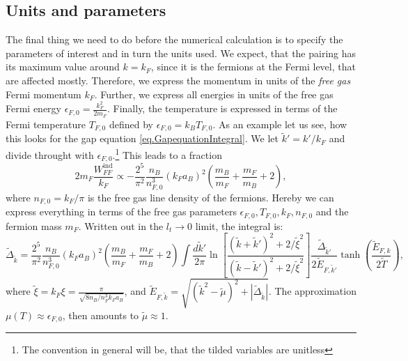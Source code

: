 \subsection{Units and parameters}
The final thing we need to do before the numerical calculation is to specify the parameters of interest and in turn the units used. We expect, that the pairing has its maximum value around $k = k_F$, since it is the fermions at the Fermi level, that are affected mostly. Therefore, we express the momentum in units of the \textit{free gas} Fermi momentum $k_F$. Further, we express all energies in units of the free gas Fermi energy $\epsilon_{F,0} = \frac{k_F^2}{2m_F}$. Finally, the temperature is expressed in terms of the Fermi temperature $T_{F,0}$ defined by $\epsilon_{F,0} = k_B T_{F,0}$. As an example let us see, how this looks for the gap equation \eqref{eq.GapequationIntegral}. We let $\tilde{k}' = k'/k_F$ and divide throught with $\epsilon_{F,0}$.\footnote{The convention in general will be, that the tilded variables are unitless} This leads to a fraction
\begin{equation}
2m_F \frac{W_{FF}^\text{ind}}{k_F} \propto -\frac{2^5}{\pi^2}\frac{n_B}{n_{F,0}^3}(k_Fa_B)^2\left(\frac{m_B}{m_F} + \frac{m_F}{m_B} + 2\right), \nonumber
\end{equation}
where $n_{F,0} = k_F/\pi$ is the free gas line density of the fermions. Hereby we can express everything in terms of the free gas parameters $\epsilon_{F,0}, T_{F,0}, k_F, n_{F,0}$ and the fermion mass $m_F$. Written out in the $l_t \to 0$ limit, the integral is:
\begin{equation}
\tilde{\Delta}_{\tilde{k}} = \frac{2^5}{\pi^2}\frac{n_B}{n_{F,0}^3}(k_Fa_B)^2\left(\frac{m_B}{m_F} + \frac{m_F}{m_B} + 2\right) \int \frac{d\tilde{k}'}{2\pi} \ln\left[\frac{(\tilde{k}+\tilde{k}')^2+2/\tilde{\xi}^2}{(\tilde{k}-\tilde{k}')^2+2/\tilde{\xi}^2}\right] \frac{\tilde{\Delta}_{\tilde{k}'}}{2\tilde{E}_{F,\tilde{k}'}}\tanh\left(\frac{\tilde{E}_{F,k}}{2\tilde{T}}\right),
\label{eq.GapequationIntegralUnitless}
\end{equation} 
where $\tilde{\xi} = k_F\xi = \frac{\pi}{\sqrt{8 n_B/n_F^3 k_Fa_B}}$, and $\tilde{E}_{F,\tilde{k}} = \sqrt{(\tilde{k}^2-\tilde{\mu})^2 + |\tilde{\Delta}_{\tilde{k}}|}$. The approximation $\mu(T) \approx \epsilon_{F,0}$, then amounts to $\tilde{\mu} \approx 1$. 

